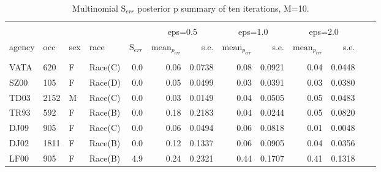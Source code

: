 \documentclass[10pt, letterpaper]{article}
\begin{document}
\begin{spacing}{1.0}
\begin{table}[h!]
    \centering
    \caption{Multinomial $\text{S}_{err}$ posterior p summary of ten iterations, M=10.}
    \label{table:mnerr-M10}
    \begin{tabular}{llllrrrrrrrrr}
        \hline\\[-10pt]
        & & & & & \multicolumn{2}{c}{eps=0.5} & \multicolumn{2}{c}{eps=1.0} & \multicolumn{2}{c}{eps=2.0} \\
        agency & occ & sex & race & $\text{S}_{err}$ & $\text{mean}_{p_{err}}$ & s.e. & $\text{mean}_{p_{err}}$ & s.e. & $\text{mean}_{p_{err}}$ & s.e. \\ 
        \hline\\[-6pt]
        VATA & 620 & F & Race(C) & 0.0 & 0.06 & 0.0738 & 0.08 & 0.0921 & 0.04 & 0.0448 \\ 
        SZ00 & 105 & F & Race(D) & 0.0 & 0.05 & 0.0499 & 0.03 & 0.0391 & 0.03 & 0.0380 \\ 
        TD03 & 2152 & M & Race(C) & 0.0 & 0.03 & 0.0149 & 0.04 & 0.0505 & 0.05 & 0.0483 \\ 
        TR93 & 592 & F & Race(B) & 0.0 & 0.18 & 0.2183 & 0.04 & 0.0244 & 0.05 & 0.0820 \\ 
        DJ09 & 905 & F & Race(C) & 0.0 & 0.06 & 0.0494 & 0.06 & 0.0818 & 0.01 & 0.0048 \\ 
        DJ02 & 1811 & F & Race(B) & 0.0 & 0.12 & 0.1337 & 0.06 & 0.0905 & 0.04 & 0.0356 \\ 
        LF00 & 905 & F & Race(B) & 4.9 & 0.24 & 0.2321 & 0.44 & 0.1707 & 0.41 & 0.1318 \\ 
        \hline
    \end{tabular}
\end{table}


\end{spacing}
\end{document}
